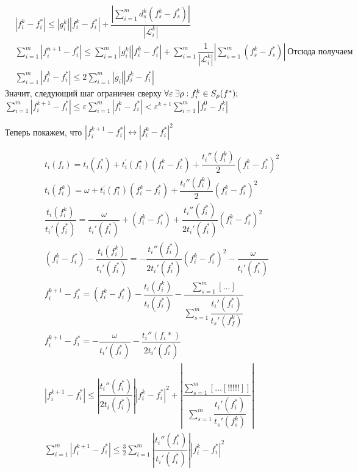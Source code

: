 \documentclass[12pt,a4paper,titlepage,oneside]{book}
\theoremstyle{definition}
\theoremstyle{plain}
\theoremstyle{remark}
\theoremstyle{remark}
\theoremstyle{plain}
\theoremstyle{plain}
\begin{document}
\begin{align*}
&|f_i^k-f_i^*|\leqslant |g_i^k||f_i^k-f_i^*|+\dfrac{\left  |\sum \limits_{i=1}^m d_s^k(f_s^k-f_s^*)\right | }{|\mathscr{L}_i^k|}\\
& \sum \limits_{i=1}^m|f_i^{n+1}-f_i^*| \leqslant \sum \limits_{i=1}^m|g_i^k||f_i^k-f_i^*|+\sum\limits_{i=1}^m \dfrac{1}{|\mathscr{L}_i^k|} \left|\sum \limits_{s=1}^m(f_s^k-f_s^*)\right| \: \text {Отсюда получаем}\\
&\sum \limits_{i=1}^m |f_i^k-f_i^*| \leqslant 2\sum \limits_{i=1}^m |g_i||f_i^k-f_i^*| 
\end{align*}
 Значит, следующий шаг ограничен сверху $ \forall  \varepsilon \: \exists  \rho: f_i^k \in S_\rho(f^*); \\ $
 $ \sum \limits_{i=1}^m |f_i^{k+1}-f_i^*|\leqslant \varepsilon \sum \limits_{i=1}^m |f_i^k-f_i^*|< \varepsilon^{k+1}\sum \limits_{i=1}^m |f_i^0-f_i^k|  $

Теперь покажем, что $ |f_i^{k+1}-f_i^*| \leftrightarrow |f_i^k-f_i^*|^2$


\begin{align*}
&t_i(f_i)=t_i(f_i^*)+ t_i^{\prime} (f_i^\star)(f_i^k-f_i^*)+ \dfrac{t_i'' (f_i^k)}{2} (f_i^k-f_i^*)^2\\
&t_i(f_i^k)=\omega+ t_i^{\prime} (f_i^\star)(f_i^k-f_i^*)+ \dfrac{t_i'' (f_i^k)}{2} (f_i^k-f_i^*)^2\\
&\dfrac{t_i(f_i^k)}{t_i'(f_i^*)} = \dfrac{\omega}{t_i'(f_i^*)}+(f_i^k-f_i^*)+\dfrac{t_i''(f_i^*)}{2t_i'(f_i^*)}(f_i^k-f_i^*)^2\\
&(f_i^k-f_i^*)-\dfrac{t_i(f_i^k)}{t_i'(f_i^*)}=-\dfrac{t_i''(f_i^*)}{2t_i'(f_i^*)}(f_i^k-f_i^*)^2-\dfrac{\omega}{t_i'(f_i^*)}\\
&f_i^{k+1}-f_i^*=(f_i^k-f_i^*)-\dfrac{t_i(f_i^k)}{t_i(f_i^*)}-\dfrac{\sum \limits_{s=1}^m[\dots]}{\sum \limits_{s=1}^m\dfrac{t_i'(f_i^*)}{t_s'(f_f^k)}}\\
&f_i^{k+1}-f_i^*=-\dfrac{\omega}{t_i'(f_i^*)}-\dfrac{t_i''(f_i*)}{2t_i'(f_i^*)}\\
&|f_i^{k+1}-f_i^*| \leqslant \left | \dfrac{t_i''(f_i^*)}{2t_i(f_i^*)} \right | \left | f_i^k-f_i^*\right |^2  +\left |\dfrac{\sum \limits_{s=1}^m[\dots[!!!!!]]}{\sum \limits_{s=1}^m \dfrac{t_i'(f_i^*)}{t_s'(f_s^k)}}  \right |\\
& \sum \limits_{i=1}^m \left | f_i^{k+1}-f_i^*\right | \leqslant \frac{3}{2} \sum \limits_{i=1}^m  \left | \dfrac{t_i''(f_i^*)}{t_i'(f_i^*)}  \right |  \left | f_i^k-f_i^* \right |^2\\
\end{align*}
\end{document}
